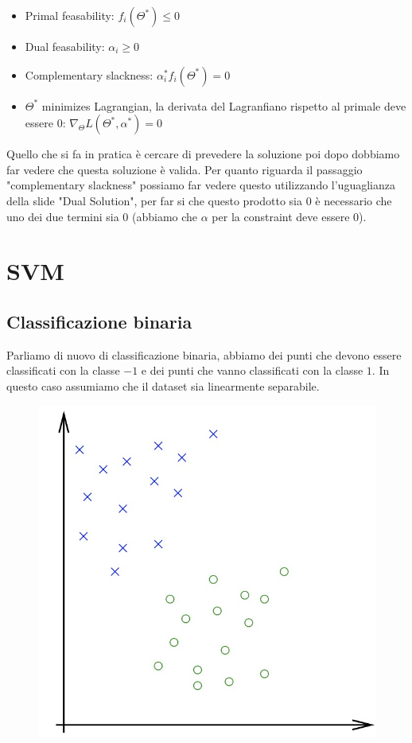 \documentclass[14pt]{extreport}
\begin{document}
\begin{itemize}
\item Primal feasability: $f_i(\Theta^*) \leq 0$
\item Dual feasability: $\alpha_i \geq 0$
\item Complementary slackness: $\alpha_i^*f_i(\Theta^*) = 0$
\item $\Theta^*$ minimizes Lagrangian, la derivata del Lagranfiano rispetto al primale deve essere 0: $\nabla_\Theta L(\Theta^*, \alpha^*) = 0$
\end{itemize}

Quello che si fa in pratica è cercare di prevedere la soluzione poi dopo dobbiamo far vedere che questa soluzione è valida. Per quanto riguarda il
passaggio "complementary slackness" possiamo far vedere questo utilizzando l'uguaglianza della slide "Dual Solution", per far si che questo prodotto
sia 0 è necessario che uno dei due termini sia 0 (abbiamo che $\alpha$ per la constraint deve essere 0).


\chapter{SVM}

\section{Classificazione binaria}

Parliamo di nuovo di classificazione binaria, abbiamo dei punti che devono essere classificati con la classe $-1$ e dei punti che vanno classificati
con la classe $1$. In questo caso assumiamo che il dataset sia linearmente separabile.
\begin{figure}[H]
\centering
\includegraphics[width=0.4\linewidth]{310.jpeg}
\end{figure}
\end{document}
